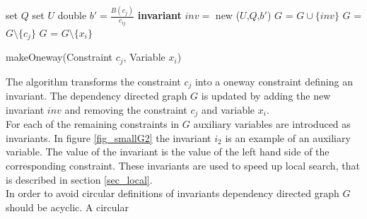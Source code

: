 \IncMargin{1em}
\begin{algorithm}[H]
\algdata
{}
\BlankLine
set $Q$ 
set $U$ 
double $b' = \frac{B(c_j)}{c_{ij}}$ \;
 \;
\textbf{invariant} $inv = $ new \Sum($U$,$Q$,$b'$)\; 
$G$ = $G \cup \{inv\}$\; 
$G$ = $G \setminus \{c_j\}$\; 
$G$ = $G \setminus \{x_i\}$\;

 \caption{makeOneway(\textsf{Constraint} $c_j$, \textsf{Variable} $x_i$)} \label{algo_makeoneway}
\end{algorithm}\DecMargin{1em} \noindent
The algorithm transforms the constraint $c_j$ into a oneway constraint defining an invariant. The dependency directed 
graph $G$ is updated by adding the new invariant $inv$ and removing the constraint $c_j$ and variable $x_i$. \medskip 
\\ 
For each of the remaining constraints in $G$ auxiliary variables are introduced as invariants. In figure 
\ref{fig_smallG2} the invariant $i_2$ is an example of an auxiliary variable. The value of the invariant is the value 
of the left hand side of the corresponding constraint. These invariants are used to speed up local search, that is 
described in section \ref{sec_local}. \\
In order to avoid circular definitions of invariants dependency directed graph $G$ should be acyclic. A circular 
